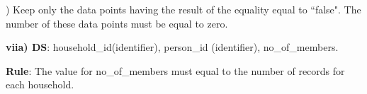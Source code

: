 ) Keep only the data points having the result of the equality equal to ``false". The number of these data points must be equal to zero.


\bigskip
\bigskip
\begin{table}
\begin{center}
\footnotesize
{}
\caption{ The hierarchy COICOP\_HC}
\centering
\label{Tab1-7}
\end{center}
\end{table}


\begin{table}
\begin{center}
\footnotesize
{}
\caption{Translation of example vi)}
\centering
\label{Tab1-8}
\end{center}
\end{table}


\bigskip\noindent
\textbf{viia) DS}: household\_id(identifier), person\_id (identifier), no\_of\_members.

\bigskip\noindent
\textbf{Rule}: The value for no\_of\_members must equal to the number of records for each household.

